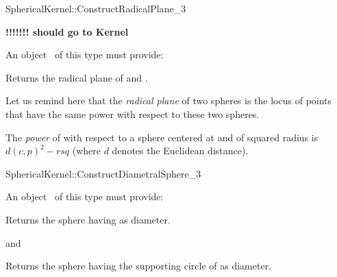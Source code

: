 \begin{ccRefFunctionObjectConcept}{SphericalKernel::ConstructRadicalPlane_3}

\textbf{!!!!!!! should go to Kernel}

An object \ccVar\ of this type must provide:

{Returns the radical plane of  and .}

Let us remind here that the \textit{radical plane} of two spheres is the 
locus of points  that have the same power with respect 
to these two spheres.

The \textit{power} of  with respect to a sphere  centered at 
 and of squared radius  is $ d(c,p)^2 - rsq $
(where $d$ denotes the Euclidean distance). 

\end{ccRefFunctionObjectConcept}
\begin{ccRefFunctionObjectConcept}{SphericalKernel::ConstructDiametralSphere_3}

An object \ccVar\ of this type must provide:

{Returns the sphere having  as diameter.}

and

{Returns the sphere having the supporting circle of  as diameter.}

\end{ccRefFunctionObjectConcept}
